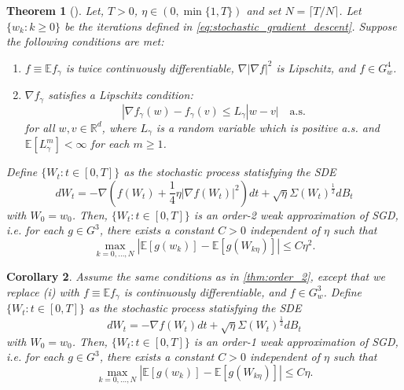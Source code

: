 \documentclass[12pt]{article}
\newtheorem{theorem}{Theorem}[section]
\newtheorem{corollary}[theorem]{Corollary}
\theoremstyle{definition}
\numberwithin{equation}{section}
\newcommand{\R}{\mathbb{R}}
\newcommand{\E}{\mathbb{E}}
\newcommand{\ev}[1]{\mathbb{E}\left[{#1}\right]}
\begin{document}
\begin{theorem}[\autocite{liStochasticModifiedEquations2019}]
  \label{thm:order_2}
  Let, $T > 0$, $\eta \in (0, \min\{1,T\})$ and set $N = \lceil T/N \rceil$. Let $\{w_k:k\geq 0\}$ be the iterations defined in \autoref{eq:stochastic_gradient_descent}. Suppose the following conditions are met:
  \begin{enumerate}
    \item $f \equiv \E f_{\gamma}$ is twice continuously differentiable, $\nabla |\nabla f |^2$ is Lipschitz, and $f \in G^4_w$.
    \item $\nabla f_{\gamma}$ satisfies a Lipschitz condition:
    \begin{equation*}
      |\nabla f_{\gamma}(w) - f_{\gamma}(v) \leq L_{\gamma} |w - v| \quad \text{a.s.}
    \end{equation*}
    for all $w,v \in \R^d$, where $L_{\gamma}$ is a random variable which is positive a.s. and $\ev{L_{\gamma}^m} < \infty$ for each $m \geq 1$.
  \end{enumerate}
  Define $\{W_t:t\in [0,T] \}$ as the stochastic process statisfying the SDE
  \begin{equation}
    d W_t = -\nabla(f(W_t) + \frac{1}{4}\eta |\nabla f(W_t)|^2)dt + \sqrt{\eta}\Sigma(W_t)^{\frac{1}{2}}dB_t
  \end{equation}
  with $W_0 = w_0$. Then, $\{W_t:t\in [0,T] \}$ is an order-2 weak approximation of SGD, i.e. for each $g \in G^3$, there exists a constant $C > 0$ independent of $\eta$ such that
  \begin{equation}
    \max_{k=0,\dots,N} |\ev{g(w_k)} - \ev{g(W_{k\eta})}| \leq C \eta^2.
  \end{equation}
\end{theorem}
\begin{corollary}
  Assume the same conditions as in \autoref{thm:order_2}, except that we replace (i) with $f \equiv \E f_{\gamma}$ is continuously differentiable, and $f \in G^3_w$.
  Define $\{W_t:t\in [0,T] \}$ as the stochastic process statisfying the SDE
  \begin{equation}
    d W_t = -\nabla f(W_t) dt + \sqrt{\eta}\Sigma(W_t)^{\frac{1}{2}}dB_t
  \end{equation}
  with $W_0 = w_0$. Then, $\{W_t:t\in [0,T] \}$ is an order-1 weak approximation of SGD, i.e. for each $g \in G^3$, there exists a constant $C > 0$ independent of $\eta$ such that
  \begin{equation}
    \max_{k=0,\dots,N} |\ev{g(w_k)} - \ev{g(W_{k\eta})}| \leq C \eta.
  \end{equation}
\end{corollary}
\end{document}
